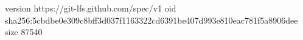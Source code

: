 version https://git-lfs.github.com/spec/v1
oid sha256:5cbdbe0e309c8bff3d037f1163322cd6391be407d993e810eac781f5a8906dee
size 87540
